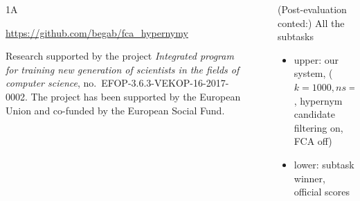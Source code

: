 \documentclass{beamer}
\newlength{\sepwid}
\newlength{\onecolwid}
\begin{document}
\begin{frame}[t]
\begin{columns}[t]
\begin{column}{\onecolwid}
\begin{block}{1A}
    \end{block}

  \vskip3cm
  \begin{alertblock}{} \url{https://github.com/begab/fca_hypernymy} \end{alertblock} 

    \begin{block}{}
        {\footnotesize Research supported by the project \emph{Integrated
        program for training new generation of scientists in the fields of computer
        science}, no.~EFOP-3.6.3-VEKOP-16-2017-0002. The project has been supported
        by the European Union and co-funded by the European Social Fund.}
  \end{block}
\end{column}


\begin{column}{\sepwid} %
\end{column}

\begin{column}{\onecolwid} %
  \begin{block}{(Post-evaluation conted:) All the subtasks}

        

        \begin{itemize}
          \item upper: our system, ($k = 1000, ns = 50$, hypernym candidate
            filtering on, FCA off) 
          \item lower: subtask winner, official scores 
        \end{itemize}


      \end{block}



\end{column}
\end{columns}
\end{frame}
\end{document}
